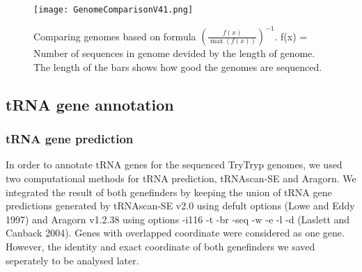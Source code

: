 \documentclass[
10pt, %
a4paper, %
oneside, %
headinclude,footinclude, %
BCOR5mm, %
]{scrartcl}
\begin{document}
\begin{figure}[tb]
\centering 
\texttt{[image: GenomeComparisonV41.png]} 
\caption[Genome Comparison]{Comparing genomes based on formula ${(\frac{f(x)}{\max(f(x))})}^{-1}$. f(x) = Number of sequences in genome devided by the length of genome. The length of the bars shows how good the genomes are sequenced.} %
\label{fig:gallery} 
\end{figure}

\subsection{\textbf{tRNA gene annotation}}
\subsubsection{tRNA gene prediction}
In order to annotate tRNA genes for the sequenced TryTryp genomes, we used two computational methods for tRNA prediction, tRNAscan-SE and Aragorn. We integrated the result of both genefinders by keeping the union of tRNA gene predictions generated by tRNAscan-SE v2.0 using defult options (Lowe and Eddy 1997) and Aragorn v1.2.38 using options -i116 -t -br -seq -w -e -l -d (Laslett and Canback 2004). Genes with overlapped coordinate were considered as one gene. However, the identity and exact coordinate of both genefinders we saved seperately to be analysed later. 

\end{document}
